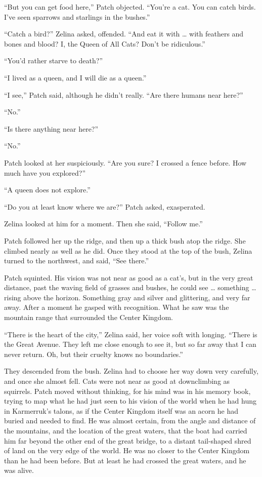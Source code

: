 \documentclass[ebook,oneside,openany,17pt]{memoir}
\begin{document}
“But you can get food here,” Patch objected. “You’re a cat. You can
catch birds. I’ve seen sparrows and starlings in the bushes.”

“Catch a bird?” Zelina asked, offended. “And eat it with … with
feathers and bones and blood? I, the Queen of All Cats? Don’t be
ridiculous.”

“You’d rather starve to death?”

“I lived as a queen, and I will die as a queen.”

“I see,” Patch said, although he didn’t really. “Are there humans near
here?”

“No.”

“Is there anything near here?”

“No.”

Patch looked at her suspiciously. “Are you sure? I crossed a fence
before. How much have you explored?”

“A queen does not explore.”

“Do you at least know where we are?” Patch asked, exasperated.

Zelina looked at him for a moment. Then she said, “Follow me.”

Patch followed her up the ridge, and then up a thick bush atop the
ridge. She climbed nearly as well as he did. Once they stood at the
top of the bush, Zelina turned to the northwest, and said, “See
there.”

Patch squinted. His vision was not near as good as a cat’s, but in the
very great distance, past the waving field of grasses and bushes, he
could see … something … rising above the horizon. Something gray and
silver and glittering, and very far away. After a moment he gasped
with recognition. What he saw was the mountain range that surrounded
the Center Kingdom.

“There is the heart of the city,” Zelina said, her voice soft with
longing. “There is the Great Avenue. They left me close enough to see
it, but so far away that I can never return. Oh, but their cruelty
knows no boundaries.”

They descended from the bush. Zelina had to choose her way down very
carefully, and once she almost fell. Cats were not near as good at
downclimbing as squirrels. Patch moved without thinking, for his mind
was in his memory book, trying to map what he had just seen to his
vision of the world when he had hung in Karmerruk’s talons, as if the
Center Kingdom itself was an acorn he had buried and needed to
find. He was almost certain, from the angle and distance of the
mountains, and the location of the great waters, that the boat had
carried him far beyond the other end of the great bridge, to a distant
tail-shaped shred of land on the very edge of the world. He was no
closer to the Center Kingdom than he had been before. But at least he
had crossed the great waters, and he was alive.
\end{document}

